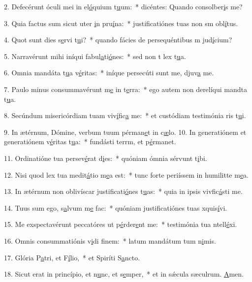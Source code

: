 2. Defecérunt óculi mei in el\uline{ó}quium t\uline{u}um:~* dicéntes: Quando consolber\uline{i}s me?\par 
3. Quia factus sum sicut uter \uline{i}n pru\uline{í}na:~* justificatiónes tuas non sm obl\uline{í}tus.\par 
4. Quot sunt dies s\uline{e}rvi t\uline{u}i?~* quando fácies de persequéntibus m jud\uline{í}cium?\par 
5. Narravérunt mihi iníqui fabul\uline{a}ti\uline{ó}nes:~* sed non t lex t\uline{u}a.\par 
6. Omnia mandáta t\uline{u}a v\uline{é}ritas:~* iníque persecúti sunt me, djuv\uline{a} me.\par 
7. Paulo minus consummavérunt m\uline{e} in t\uline{e}rra:~* ego autem non derelíqui mandta t\uline{u}a.\par 
8. Secúndum misericórdiam tuam viv\uline{í}fic\uline{a} me:~* et custódiam testimónia ris t\uline{u}i.\par 
9. In ætérnum, Dómine, verbum tuum pérman\uline{e}t in c\uline{æ}lo.
10. In generatiónem et generatiónem v\uline{é}ritas t\uline{u}a:~* fundásti terrm, et p\uline{é}rmanet.\par 
11. Ordinatióne tua persev\uline{é}rat d\uline{i}es:~* quóniam ómnia sérvunt t\uline{i}bi.\par 
12. Nisi quod lex tua medit\uline{á}tio m\uline{e}a est:~* tunc forte periíssem in humilitte m\uline{e}a.\par 
13. In ætérnum non oblivíscar justificati\uline{ó}nes t\uline{u}as:~* quia in ipsis vivfic\uline{á}sti me.\par 
14. Tuus sum ego, s\uline{a}lvum m\uline{e} fac:~* quóniam justificatiónes tuas xquis\uline{í}vi.\par 
15. Me exspectavérunt peccatóres ut p\uline{é}rder\uline{e}nt me:~* testimónia tua ntell\uline{é}xi.\par 
16. Omnis consummatiónis v\uline{i}di f\uline{i}nem:~* latum mandátum tum n\uline{i}mis.\par 
17. Glória P\uline{a}tri, et F\uline{í}lio,~* et Spiríti S\uline{a}ncto.\par 
18. Sicut erat in princípio, et n\uline{u}nc, et s\uline{e}mper,~* et in sǽcula sæculrum. \uline{A}men.\par 
